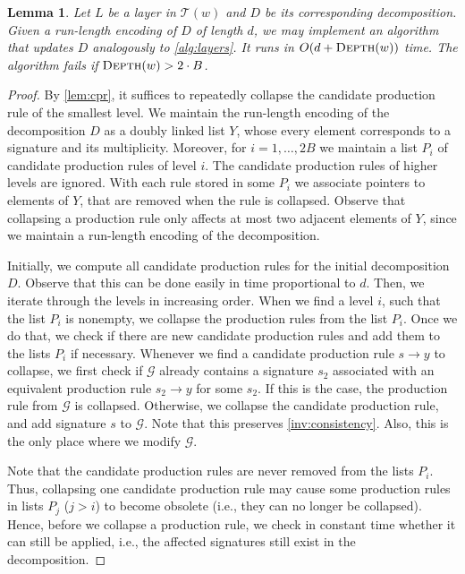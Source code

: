 \documentclass[a4paper]{article}
\newtheorem{lemma}[theorem]{Lemma}
\theoremstyle{remark}
\newcommand{\depth}{\textsc{Depth}}
\newcommand{\str}{w}
\newcommand{\strb}{y}
\newcommand{\grammar}{\mathcal{G}}
\newcommand{\mword}{B}
\newcommand{\decomp}{D}
\newcommand{\stree}{\mathcal{T}}
\begin{document}
\begin{lemma}\label{lem:compressdec}
Let $L$ be a layer in $\stree(\str)$ and $\decomp$ be its corresponding decomposition.
Given a run-length encoding of $\decomp$ of length $d$, we may implement an algorithm that updates $\decomp$ analogously to \cref{alg:layers}.
It runs in $O(d + \depth(\str))$ time.
The algorithm fails if $\depth(w) > 2\cdot \mword$.
\end{lemma}

\begin{proof}
By \cref{lem:cpr}, it suffices to repeatedly collapse the candidate production rule of the smallest level.
We maintain the run-length encoding of the decomposition $\decomp$ as a doubly linked list $Y$, whose every element corresponds to a signature and its multiplicity.
Moreover, for $i = 1, \ldots, 2\mword$ we maintain a list $P_i$ of candidate production rules of level $i$.
The candidate production rules of higher levels are ignored.
With each rule stored in some $P_i$ we associate pointers to elements of $Y$, that are removed when the rule is collapsed.
Observe that collapsing a production rule only affects at most two adjacent elements of $Y$, since we maintain a run-length encoding of the decomposition.

Initially, we compute all candidate production rules for the initial decomposition $\decomp$.
Observe that this can be done easily in time proportional to $d$.
Then, we iterate through the levels in increasing order.
When we find a level $i$, such that the list $P_i$ is nonempty, we collapse the production rules from the list $P_i$.
Once we do that, we check if there are new candidate production rules and add them to the lists $P_i$ if necessary.
Whenever we find a candidate production rule $s \rightarrow \strb$ to collapse, we first check if $\grammar$ already contains a signature $s_2$ associated with an equivalent production rule $s_2 \rightarrow \strb$ for some $s_2$.
If this is the case, the production rule from $\grammar$ is collapsed.
Otherwise, we collapse the candidate production rule, and add signature $s$ to $\grammar$.
Note that this preserves \cref{inv:consistency}.
Also, this is the only place where we modify $\grammar$.

Note that the candidate production rules are never removed from the lists $P_i$.
Thus, collapsing one candidate production rule may cause some production rules in lists $P_j$ ($j > i$) to become obsolete (i.e., they can no longer be collapsed).
Hence, before we collapse a production rule, we check in constant time whether it can still be applied, i.e., the affected signatures still exist in the decomposition.


\end{proof}
\end{document}

